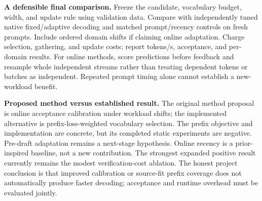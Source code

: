 \documentclass[10pt]{article}
\begin{document}
\textbf{A defensible final comparison.} Freeze the candidate, vocabulary budget, width, and update rule using validation data. Compare with independently tuned native fixed/adaptive decoding and matched prompt/recency controls on fresh prompts. Include ordered domain shifts if claiming online adaptation. Charge selection, gathering, and update costs; report tokens/s, acceptance, and per-domain results. For online methods, score predictions before feedback and resample whole independent streams rather than treating dependent tokens or batches as independent. Repeated prompt timing alone cannot establish a new-workload benefit.

\textbf{Proposed method versus established result.} The original method proposal is online acceptance calibration under workload shifts; the implemented alternative is prefix-loss-weighted vocabulary selection. The prefix objective and implementation are concrete, but its completed static experiments are negative. Pre-draft adaptation remains a next-stage hypothesis. Online recency is a prior-inspired baseline, not a new contribution. The strongest expanded positive result currently remains the modest verification-cost ablation. The honest project conclusion is that improved calibration or source-fit prefix coverage does not automatically produce faster decoding; acceptance and runtime overhead must be evaluated jointly.
\end{document}
